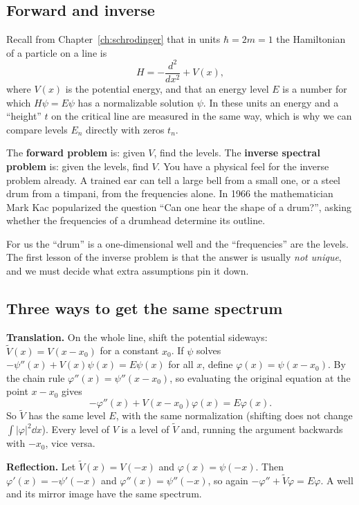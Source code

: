 \subsection{Forward and inverse}

Recall from Chapter~\ref{ch:schrodinger} that in units $\hbar=2m=1$ the Hamiltonian of a particle on a line is
\begin{equation}
H=-\frac{d^2}{dx^2}+V(x),
\label{eq:wu-sprung-H}
\end{equation}
where $V(x)$ is the potential energy, and that an energy level $E$ is a number for which $H\psi=E\psi$ has a normalizable solution $\psi$. In these units an energy and a ``height'' $t$ on the critical line are measured in the same way, which is why we can compare levels $E_n$ directly with zeros $t_n$.

The \textbf{forward problem} is: given $V$, find the levels. The \textbf{inverse spectral problem} is: given the levels, find $V$. You have a physical feel for the inverse problem already. A trained ear can tell a large bell from a small one, or a steel drum from a timpani, from the frequencies alone. In 1966 the mathematician Mark Kac popularized the question ``Can one hear the shape of a drum?'', asking whether the frequencies of a drumhead determine its outline.

For us the ``drum'' is a one-dimensional well and the ``frequencies'' are the levels. The first lesson of the inverse problem is that the answer is usually \emph{not unique}, and we must decide what extra assumptions pin it down.

\subsection{Three ways to get the same spectrum}

\textbf{Translation.} On the whole line, shift the potential sideways: $\tilde V(x)=V(x-x_0)$ for a constant $x_0$. If $\psi$ solves $-\psi''(x)+V(x)\psi(x)=E\psi(x)$ for all $x$, define $\varphi(x)=\psi(x-x_0)$. By the chain rule $\varphi''(x)=\psi''(x-x_0)$, so evaluating the original equation at the point $x-x_0$ gives
\[
-\varphi''(x)+V(x-x_0)\varphi(x)=E\varphi(x).
\]
So $\tilde V$ has the same level $E$, with the same normalization (shifting does not change $\int|\varphi|^2\dd x$). Every level of $V$ is a level of $\tilde V$ and, running the argument backwards with $-x_0$, vice versa.

\textbf{Reflection.} Let $\tilde V(x)=V(-x)$ and $\varphi(x)=\psi(-x)$. Then $\varphi'(x)=-\psi'(-x)$ and $\varphi''(x)=\psi''(-x)$, so again $-\varphi''+\tilde V\varphi=E\varphi$. A well and its mirror image have the same spectrum.

